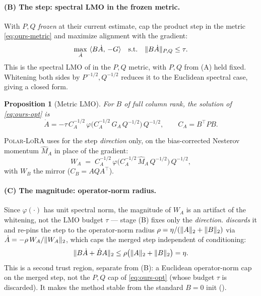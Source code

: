 \documentclass[11pt]{article}
\DeclarePairedDelimiter{\norm}{\lVert}{\rVert}
\newcommand{\polar}{\varphi}                 %
\newcommand{\methodname}{\textsc{Polar-LoRA}\xspace}
\theoremstyle{plain}
\newtheorem{proposition}{Proposition}
\theoremstyle{definition}
\theoremstyle{remark}
\begin{document}
\paragraph{(B) The step: spectral LMO in the frozen metric.} With $P,Q$ \emph{frozen} at their current estimate, cap the product step in the metric \eqref{eq:ours-metric} and maximize alignment with the gradient:
\begin{equation}
  \max_{\dot A}\ \langle B\dot A,\,-G\rangle
  \quad\text{s.t.}\quad
  \norm{B\dot A}_{P,Q}\le\tau .
  \label{eq:ours-opt}
\end{equation}
This is the spectral LMO of  in the $P,Q$ metric, with $P,Q$ from (A) held fixed. Whitening both sides by $P^{-1/2},Q^{-1/2}$ reduces it to the Euclidean spectral case, giving a closed form.
\begin{proposition}[Metric LMO]\label{prop:ours}
For $B$ of full column rank, the solution of \eqref{eq:ours-opt} is
\begin{equation*}
  \dot A = -\tau\,C_A^{-1/2}\,\polar\!\big(C_A^{-1/2}\,G_A\,Q^{-1/2}\big)\,Q^{-1/2},
  \qquad C_A=B^\top P B .
\end{equation*}
\end{proposition}
\medskip
\noindent \methodname{} uses  for the step \emph{direction} only, on the bias-corrected Nesterov momentum $\hat M_A$ in place of the gradient:
\begin{equation}
  W_A \;=\; C_A^{-1/2}\,\polar\!\big(C_A^{-1/2}\,\hat M_A\,Q^{-1/2}\big)\,Q^{-1/2},
  \label{eq:ours-lmo}
\end{equation}
with $W_B$ the mirror ($C_B=AQA^\top$).

\paragraph{(C) The magnitude: operator-norm radius.} Since $\polar(\cdot)$ has unit spectral norm, the magnitude of $W_A$ is an artifact of the whitening, not the LMO budget $\tau$ --- stage (B) fixes only the \emph{direction}.  \emph{discards} it and re-pins the step to the operator-norm radius $\rho=\eta/(\norm{A}_2+\norm{B}_2)$ via $\dot A=-\rho\,W_A/\norm{W_A}_2$, which caps the merged step independent of conditioning:
\begin{equation}
  \norm{B\dot A+\dot B A}_2\le\rho\big(\norm{A}_2+\norm{B}_2\big)=\eta .
  \label{eq:ours-prodcap}
\end{equation}
This is a second trust region, separate from (B): a Euclidean operator-norm cap on the merged step, not the $P,Q$ cap of \eqref{eq:ours-opt} (whose budget $\tau$ is discarded). It makes the method stable from the standard $B{=}0$ init ().
\end{document}
